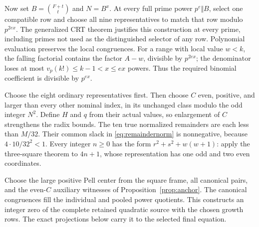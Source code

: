 Now set $B=\binom{F+t}{t}$ and $N=B^x$. At every full prime power
$p^e\Vert B$, select one compatible row and choose all nine
representatives to match that row modulo $p^{2ex}$. The generalized CRT
theorem justifies this construction at every prime, including primes not
used as the distinguished selector of any row. Polynomial evaluation
preserves the local congruences. For a range with local value $w<k$,
the falling factorial contains the factor $A-w$, divisible by $p^{2ex}$;
the denominator loses at most $v_p(k!)\le k-1<x\le ex$ powers.
Thus the required binomial coefficient is divisible by $p^{ex}$.

Choose the eight ordinary representatives first. Then choose $C$ even,
positive, and larger than every other nominal index, in its unchanged
class modulo the odd integer $N^2$. Define $H$ and $q$ from their actual
values, so enlargement of $C$ strengthens the radix bounds. The ten true
normalized remainders are each less than $M/32$. Their common slack in
\eqref{eq:remaindernorm} is nonnegative, because
$4\cdot10/32^2<1$. Every integer $n\ge0$ has the form
$r^2+s^2+w(w+1)$: apply the three-square theorem to $4n+1$,
whose representation has one odd and two even coordinates.

Choose the large positive Pell center from the square frame, all canonical
pairs, and the even-$C$ auxiliary witnesses of Proposition~\ref{prop:anchor}.
The canonical congruences fill the individual and pooled power quotients.
This constructs an integer zero of the complete retained quadratic
source with the chosen growth rows. The exact projections below carry
it to the selected final equation.

